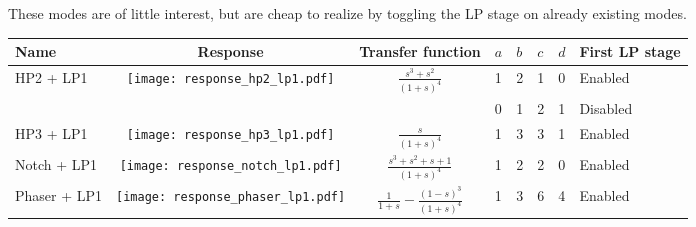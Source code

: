 \documentclass[a4paper,10pt]{article}
\begin{document}
These modes are of little interest, but are cheap to realize by toggling the LP stage on already existing modes.

\begin{tabular}{lcclllll}
\hline
Name & Response & Transfer function & $a$ & $b$ & $c$ & $d$ & First LP stage \\
\hline
HP2 + LP1 & \texttt{[image: response\_hp2\_lp1.pdf]} & $\frac{s^3 + s^2}{(1 + s)^4}$ & 1 & 2 & 1 & 0 & Enabled \\
 & & & 0 & 1 & 2 & 1 & Disabled \\
\hline
HP3 + LP1 & \texttt{[image: response\_hp3\_lp1.pdf]} & $\frac{s}{(1 + s)^4}$ & 1 & 3 & 3 & 1 & Enabled \\
\hline
Notch + LP1 & \texttt{[image: response\_notch\_lp1.pdf]} & $\frac{s^3 + s^2 + s + 1}{(1 + s)^4}$ & 1 & 2 & 2 & 0 & Enabled \\
\hline
Phaser + LP1 & \texttt{[image: response\_phaser\_lp1.pdf]} & $\frac{1}{1 + s} - \frac{(1 - s)^3}{(1 + s)^4}$ & 1 & 3 & 6 & 4 & Enabled \\
\hline
\end{tabular}
\end{document}
